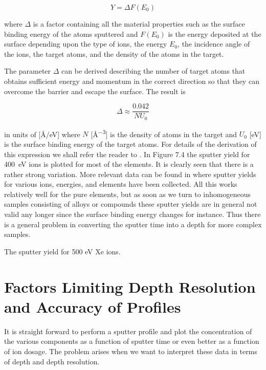 \begin{equation}
Y=\Delta F(E_0)
\end{equation}

where $\Delta$ is a factor containing all the material properties such as the surface binding energy of the atoms sputtered and $F(E_0)$ is the energy deposited at the surface depending upon the type of ions, the energy $E_0$, the incidence angle of the ions, the target atoms, and the density of the atoms in the target.

The parameter $\Delta$ can be derived describing the number of target atoms that obtains sufficient energy and momentum in the correct direction so that they can overcome the barrier and escape the surface. The result is

\begin{equation}
\Delta\approx\frac{0.042}{NU_0}
\end{equation}

in units of [\si{\angstrom /\electronvolt}] where $N$ [\si{\angstrom ^{-3}}] is the density of atoms in the target and $U_0$ [\si{\electronvolt}] is the surface binding energy of the target atoms. For details of the derivation of this expression we shall refer the reader to \cite{sigmund}. In Figure 7.4 the sputter yield for \SI{400}{\electronvolt}  ions is plotted for most of the elements. It is clearly seen that there is a rather strong variation. More relevant data can be found in \cite{behrisch} where sputter yields for various ions, energies, and elements have been collected. All this works relatively well for the pure elements, but as soon as we turn to inhomogeneous samples consisting of alloys or compounds these sputter yields are in general not valid any longer since the surface binding energy changes for instance. Thus there is a general problem in converting the sputter time into a depth for more complex samples.

 \newpage

\vspace*{11cm}

 The sputter yield for 500 eV Xe ions.\\

\section{Factors Limiting Depth Resolution and Accuracy of Profiles}
It is straight forward to perform a sputter profile and plot the concentration of the various components as a function of sputter time or even better as a function of ion dosage. The problem arises when we want to interpret these data in terms of depth and depth resolution.


